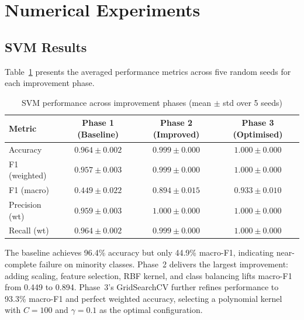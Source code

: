 \documentclass{article}
\begin{document}


\section{Numerical Experiments}

\subsection{SVM Results}

Table~\ref{tab:svm-results} presents the averaged performance metrics across five random seeds for each improvement phase.

\begin{table}[h]
  \caption{SVM performance across improvement phases (mean $\pm$ std over 5 seeds)}
  \label{tab:svm-results}
  \centering
  \small
  \begin{tabular}{lccc}
    \toprule
    Metric & Phase 1 (Baseline) & Phase 2 (Improved) & Phase 3 (Optimised) \\
    \midrule
    Accuracy        & $0.964 \pm 0.002$ & $0.999 \pm 0.000$ & $\mathbf{1.000 \pm 0.000}$ \\
    F1 (weighted)   & $0.957 \pm 0.003$ & $0.999 \pm 0.000$ & $\mathbf{1.000 \pm 0.000}$ \\
    F1 (macro)      & $0.449 \pm 0.022$ & $0.894 \pm 0.015$ & $\mathbf{0.933 \pm 0.010}$ \\
    Precision (wt)  & $0.959 \pm 0.003$ & $1.000 \pm 0.000$ & $\mathbf{1.000 \pm 0.000}$ \\
    Recall (wt)     & $0.964 \pm 0.002$ & $0.999 \pm 0.000$ & $\mathbf{1.000 \pm 0.000}$ \\
    \bottomrule
  \end{tabular}
\end{table}

The baseline achieves 96.4\% accuracy but only 44.9\% macro-F1, indicating near-complete failure on minority classes. Phase~2 delivers the largest improvement: adding scaling, feature selection, RBF kernel, and class balancing lifts macro-F1 from 0.449 to 0.894. Phase~3's GridSearchCV further refines performance to 93.3\% macro-F1 and perfect weighted accuracy, selecting a polynomial kernel with $C\!=\!100$ and $\gamma\!=\!0.1$ as the optimal configuration.
\end{document}
